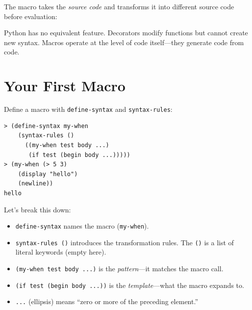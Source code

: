 The macro takes the \emph{source code} and transforms it into different source code before evaluation:

\begin{center}
\end{center}

\begin{note}
Python has no equivalent feature. Decorators modify functions but cannot create new syntax. Macros operate at the level of code itself---they generate code from code.
\end{note}

\section{Your First Macro}

Define a macro with \texttt{define-syntax} and \texttt{syntax-rules}:

\begin{lstlisting}[style=repl]
> (define-syntax my-when
    (syntax-rules ()
      ((my-when test body ...)
       (if test (begin body ...)))))
> (my-when (> 5 3)
    (display "hello")
    (newline))
hello
\end{lstlisting}

Let's break this down:

\begin{itemize}
    \item \texttt{define-syntax} names the macro (\texttt{my-when}).
    \item \texttt{syntax-rules ()} introduces the transformation rules. The \texttt{()} is a list of literal keywords (empty here).
    \item \texttt{(my-when test body ...)} is the \emph{pattern}---it matches the macro call.
    \item \texttt{(if test (begin body ...))} is the \emph{template}---what the macro expands to.
    \item \texttt{...} (ellipsis) means ``zero or more of the preceding element.''
\end{itemize}

